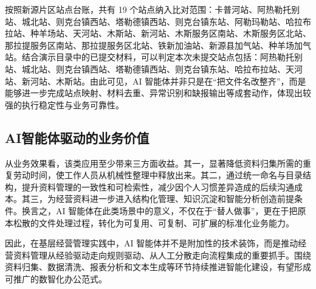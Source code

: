 按照新源片区站点台账，共有 19 个站点纳入比对范围：卡普河站、阿热勒托别站、城北站、则克台镇西站、塔勒德镇西站、则克台镇东站、阿勒玛勒站、哈拉布拉站、种羊场站、天河站、木斯站、新河站、木斯服务区南站、木斯服务区北站、那拉提服务区南站、那拉提服务区北站、铁新加油站、新源县加气站、种羊场加气站。结合演示目录中的已提交材料，可以判定本次未提交站点包括：阿热勒托别站、城北站、则克台镇西站、塔勒德镇西站、则克台镇东站、哈拉布拉站、天河站、新河站、木斯站。由此可见，AI 智能体并非只是在“把文件名改整齐”，而是能够进一步完成站点映射、材料去重、异常识别和缺报输出等成套动作，体现出较强的执行稳定性与业务可靠性。

\subsection{AI智能体驱动的业务价值}

从业务效果看，该类应用至少带来三方面收益。其一，显著降低资料归集所需的重复劳动时间，使工作人员从机械性整理中释放出来。其二，通过统一命名与目录结构，提升资料管理的一致性和可检索性，减少因个人习惯差异造成的后续沟通成本。其三，为经营资料进一步进入结构化管理、知识沉淀和智能分析创造前提条件。换言之，AI 智能体在此类场景中的意义，不仅在于“替人做事”，更在于把原本松散的文件处理过程，转化为可复用、可复制、可扩展的标准化业务能力。

因此，在基层经营管理实践中，AI 智能体并不是附加性的技术装饰，而是推动经营资料管理从经验驱动走向规则驱动、从人工分散走向流程集成的重要抓手。围绕资料归集、数据清洗、报表分析和文本生成等环节持续推进智能化建设，有望形成可推广的数智化办公范式。
